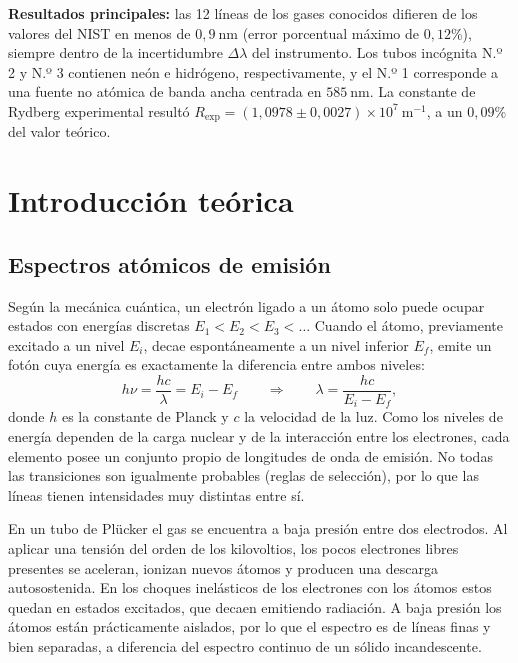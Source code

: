 \documentclass{article}
\newcommand{\nm}{\ \mathrm{nm}}
\begin{document}
\textbf{Resultados principales:} las 12 líneas de los gases conocidos difieren de los valores del NIST en menos de $0,9\nm$ (error porcentual máximo de $0,12\%$), siempre dentro de la incertidumbre $\Delta\lambda$ del instrumento. Los tubos incógnita N.º 2 y N.º 3 contienen neón e hidrógeno, respectivamente, y el N.º 1 corresponde a una fuente no atómica de banda ancha centrada en $585\nm$. La constante de Rydberg experimental resultó $R_{\mathrm{exp}}=(1,0978\pm0,0027)\times10^{7}\ \mathrm{m^{-1}}$, a un $0,09\%$ del valor teórico.

\section{Introducción teórica}

\subsection{Espectros atómicos de emisión}

Según la mecánica cuántica, un electrón ligado a un átomo solo puede ocupar estados con energías discretas $E_1<E_2<E_3<\dots$ Cuando el átomo, previamente excitado a un nivel $E_i$, decae espontáneamente a un nivel inferior $E_f$, emite un fotón cuya energía es exactamente la diferencia entre ambos niveles:
\begin{equation}
    h\nu = \frac{hc}{\lambda} = E_i-E_f
    \qquad\Longrightarrow\qquad
    \lambda=\frac{hc}{E_i-E_f},
    \label{eq:foton}
\end{equation}
donde $h$ es la constante de Planck y $c$ la velocidad de la luz. Como los niveles de energía dependen de la carga nuclear y de la interacción entre los electrones, cada elemento posee un conjunto propio de longitudes de onda de emisión. No todas las transiciones son igualmente probables (reglas de selección), por lo que las líneas tienen intensidades muy distintas entre sí.

En un tubo de Plücker el gas se encuentra a baja presión entre dos electrodos. Al aplicar una tensión del orden de los kilovoltios, los pocos electrones libres presentes se aceleran, ionizan nuevos átomos y producen una descarga autosostenida. En los choques inelásticos de los electrones con los átomos estos quedan en estados excitados, que decaen emitiendo radiación. A baja presión los átomos están prácticamente aislados, por lo que el espectro es de líneas finas y bien separadas, a diferencia del espectro continuo de un sólido incandescente.
\end{document}
